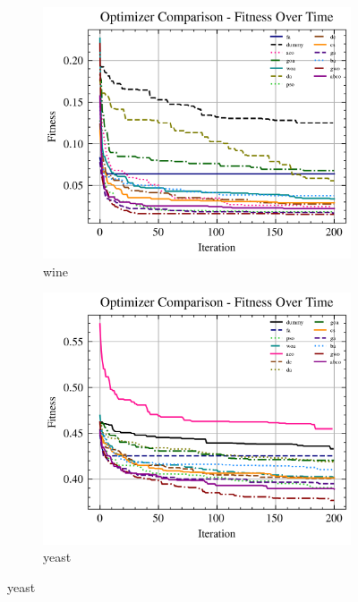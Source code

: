 \begin{figure}[htp]
    \begin{subfigure}[b]{0.45\textwidth}
        \includegraphics[width=\textwidth]{imagenes/fitness_charts/img/binary/wine/optimizers_fitness_knn.png}
        \caption{wine}
        \label{fig:convergencia_wine_knn}
    \end{subfigure}
    \begin{subfigure}[b]{0.45\textwidth}
        \includegraphics[width=\textwidth]{imagenes/fitness_charts/img/binary/yeast/optimizers_fitness_knn.png}
        \caption{yeast}
        \label{fig:convergencia_yeast_knn}
    \end{subfigure}


\end{figure}

